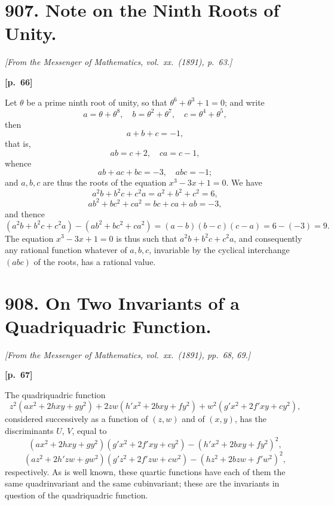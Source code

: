 \documentclass[11pt,a4paper]{article}
\theoremstyle{plain}
\begin{document}
\newpage

\section*{907. Note on the Ninth Roots of Unity.}

\noindent\textit{[From the Messenger of Mathematics, vol.\ xx.\ (1891), p.\ 63.]}

\vspace{0.5em}
\noindent\textbf{[p.\ 66]}

Let $\theta$ be a prime ninth root of unity, so that $\theta^6 + \theta^3 + 1 = 0$; and write
$$
a = \theta + \theta^8, \quad b = \theta^2 + \theta^7, \quad c = \theta^4 + \theta^5,
$$
then
$$
a + b + c = -1,
$$
that is,
$$
ab = c + 2, \quad ca = c - 1,
$$
whence
$$
ab + ac + bc = -3, \quad abc = -1;
$$
and $a, b, c$ are thus the roots of the equation $x^3 - 3x + 1 = 0$. We have
$$
a^2 b + b^2 c + c^2 a = a^2 + b^2 + c^2 = 6,
$$
$$
ab^2 + bc^2 + ca^2 = bc + ca + ab = -3,
$$
and thence
$$
(a^2 b + b^2 c + c^2 a) - (ab^2 + bc^2 + ca^2) = (a - b)(b - c)(c - a) = 6 - (-3) = 9.
$$
The equation $x^3 - 3x + 1 = 0$ is thus such that $a^2 b + b^2 c + c^2 a$, and consequently any rational function whatever of $a, b, c$, invariable by the cyclical interchange $(abc)$ of the roots, has a rational value.

\newpage

\section*{908. On Two Invariants of a Quadriquadric Function.}

\noindent\textit{[From the Messenger of Mathematics, vol.\ xx.\ (1891), pp.\ 68, 69.]}

\vspace{0.5em}
\noindent\textbf{[p.\ 67]}

The quadriquadric function
$$
z^2(ax^2 + 2hxy + gy^2) + 2zw(h'x^2 + 2bxy + fy^2) + w^2(g'x^2 + 2f'xy + cy^2),
$$
considered successively as a function of $(z, w)$ and of $(x, y)$, has the discriminants $U$, $V$, equal to
$$
(ax^2 + 2hxy + gy^2)(g'x^2 + 2f'xy + cy^2) - (h'x^2 + 2bxy + fy^2)^2,
$$
$$
(az^2 + 2h'zw + gw^2)(g'z^2 + 2f'zw + cw^2) - (hz^2 + 2bzw + f'w^2)^2,
$$
respectively. As is well known, these quartic functions have each of them the same quadrinvariant and the same cubinvariant; these are the invariants in question of the quadriquadric function.
\end{document}
